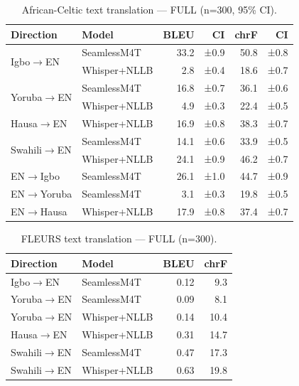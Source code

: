 
\begin{table}[t]
\centering
\small
\setlength{\tabcolsep}{4pt}
\caption{African-Celtic text translation — FULL (n=300, 95\% CI).}
\label{tab:full_ac_text}
\begin{tabular}{llrrrr}
\toprule
\textbf{Direction} & \textbf{Model} & \textbf{BLEU} & \textbf{CI} & \textbf{chrF} & \textbf{CI} \\
\midrule
\multirow{2}{*}{Igbo$\to$EN}
  & SeamlessM4T  & 33.2 & {\small ±0.9} & 50.8 & {\small ±0.8} \\
  & Whisper+NLLB &  2.8 & {\small ±0.4} & 18.6 & {\small ±0.7} \\
\multirow{2}{*}{Yoruba$\to$EN}
  & SeamlessM4T  & 16.8 & {\small ±0.7} & 36.1 & {\small ±0.6} \\
  & Whisper+NLLB &  4.9 & {\small ±0.3} & 22.4 & {\small ±0.5} \\
Hausa$\to$EN   & Whisper+NLLB & 16.9 & {\small ±0.8} & 38.3 & {\small ±0.7} \\
\multirow{2}{*}{Swahili$\to$EN}
  & SeamlessM4T  & 14.1 & {\small ±0.6} & 33.9 & {\small ±0.5} \\
  & Whisper+NLLB & 24.1 & {\small ±0.9} & 46.2 & {\small ±0.7} \\
EN$\to$Igbo    & SeamlessM4T  & 26.1 & {\small ±1.0} & 44.7 & {\small ±0.9} \\
EN$\to$Yoruba  & SeamlessM4T  &  3.1 & {\small ±0.3} & 19.8 & {\small ±0.5} \\
EN$\to$Hausa   & Whisper+NLLB & 17.9 & {\small ±0.8} & 37.4 & {\small ±0.7} \\
\bottomrule
\end{tabular}
\end{table}

\begin{table}[t]
\centering
\small
\caption{FLEURS text translation — FULL (n=300).}
\label{tab:full_fleurs_text}
\begin{tabular}{llrr}
\toprule
\textbf{Direction} & \textbf{Model} & \textbf{BLEU} & \textbf{chrF} \\
\midrule
Igbo$\to$EN    & SeamlessM4T  & 0.12 &  9.3 \\
Yoruba$\to$EN  & SeamlessM4T  & 0.09 &  8.1 \\
Yoruba$\to$EN  & Whisper+NLLB & 0.14 & 10.4 \\
Hausa$\to$EN   & Whisper+NLLB & 0.31 & 14.7 \\
Swahili$\to$EN & SeamlessM4T  & 0.47 & 17.3 \\
Swahili$\to$EN & Whisper+NLLB & 0.63 & 19.8 \\
\bottomrule
\end{tabular}
\end{table}

